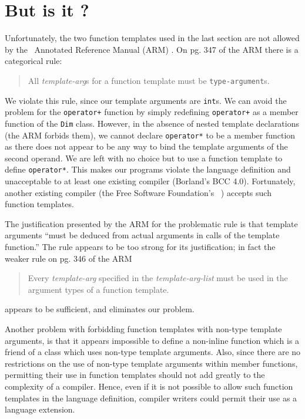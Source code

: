 \section{But is it \cpp?}

Unfortunately, the two function templates used in the last section
are not allowed by the \cpp\ Annotated Reference Manual (ARM)
\cite{ellis:90}.  On pg. 347 of the ARM there is a categorical
rule: \begin{quote} All {\em template-arg\/}s for a function
template must be {\tt type-argument}s.  \end{quote} We violate
this rule, since our template arguments are {\tt int}s.  We can
avoid the problem for the {\tt operator+} function by simply
redefining {\tt operator+} as a member function of the {\tt Dim}
class.  However, in the absence of nested template declarations
(the ARM forbids them), we cannot declare {\tt operator*} to be a
member function as there does not appear to be any way to bind the
template arguments of the second operand.  We are left with no
choice but to use a function template to define {\tt operator*}.
This makes our programs violate the language definition and
unacceptable to at least one existing compiler (Borland's BCC
4.0).  Fortunately, another existing compiler (the Free Software
Foundation's \gpp\ \cite{stallman:93}) accepts such function
templates.

The justification presented by the ARM for the problematic rule is
that template arguments ``must be deduced from actual arguments in
calls of the template function.''  The rule appears to be too
strong for its justification; in fact the weaker rule on
pg. 346 of the ARM \begin{quote} Every {\em template-arg}
specified in the {\em temp\-late-arg-list} must be used in the
argument types of a function template.  \end{quote} appears to be
sufficient, and eliminates our problem.

Another problem with forbidding function templates with non-type
template arguments, is that it appears impossible to define a
non-inline function which is a friend of a class which uses
non-type template arguments.  Also, since there are no
restrictions on the use of non-type template arguments within
member functions, permitting their use in function templates
should not add greatly to the complexity of a compiler.  Hence,
even if it is not possible to allow such function templates in the
language definition, compiler writers could permit their use as a
language extension.


